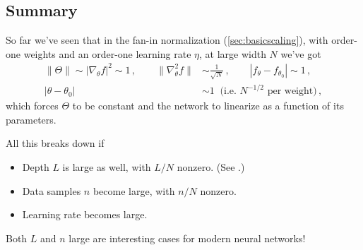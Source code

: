 \documentclass[11pt]{article}
\begin{document}
\subsection{Summary}

So far we've seen that in the fan-in normalization (\cref{sec:basicscaling}), with order-one weights and an order-one learning rate $\eta$, at large width $N$ we've got
%
\begin{equation}
    \begin{aligned}
    \|\Theta\|\sim |\nabla_\theta f|^2 \sim 1\,,\qquad \|\nabla_\theta^2 f\|&\sim \frac{1}{\sqrt N}\,,\qquad |f_\theta-f_{\theta_0}|\sim 1\,, \\
    |\theta-\theta_0|&\sim 1 \;\;\text{(i.e. } N^{-1/2}\text{ per weight)}\,,
    \end{aligned}
\end{equation}
%
which forces $\Theta$ to be constant and the network to linearize as a function of its parameters.

All this breaks down if
\begin{itemize}
    \item Depth $L$ is large as well, with $L/N$ nonzero. (See \cite[Ch. 11]{roberts2022principles}.)
    \item Data samples $n$ become large, with $n/N$ nonzero.
    \item Learning rate becomes large.
\end{itemize}
%
Both $L$ and $n$ large are interesting cases for modern neural networks!
\end{document}
